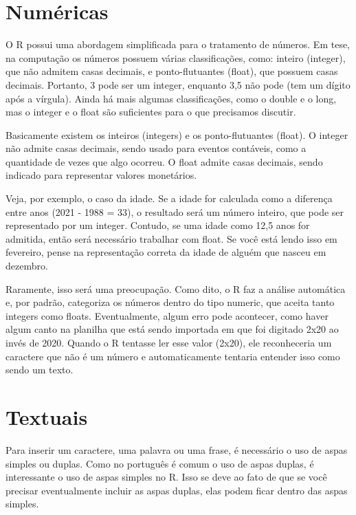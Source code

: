 \documentclass[
]{book}
\begin{document}
\hypertarget{numuxe9ricas}{%
\section{Numéricas}\label{numuxe9ricas}}

O R possui uma abordagem simplificada para o tratamento de números. Em tese, na computação os números possuem várias classificações, como: inteiro (integer), que não admitem casas decimais, e ponto-flutuantes (float), que possuem casas decimais. Portanto, 3 pode ser um integer, enquanto 3,5 não pode (tem um dígito após a vírgula). Ainda há mais algumas classificações, como o double e o long, mas o integer e o float são suficientes para o que precisamos discutir.

Basicamente existem os inteiros (integers) e os ponto-flutuantes (float). O integer não admite casas decimais, sendo usado para eventos contáveis, como a quantidade de vezes que algo ocorreu. O float admite casas decimais, sendo indicado para representar valores monetários.

Veja, por exemplo, o caso da idade. Se a idade for calculada como a diferença entre anos (2021 - 1988 = 33), o resultado será um número inteiro, que pode ser representado por um integer. Contudo, se uma idade como 12,5 anos for admitida, então será necessário trabalhar com float. Se você está lendo isso em fevereiro, pense na representação correta da idade de alguém que nasceu em dezembro.

Raramente, isso será uma preocupação. Como dito, o R faz a análise automática e, por padrão, categoriza os números dentro do tipo numeric, que aceita tanto integers como floats. Eventualmente, algum erro pode acontecer, como haver algum canto na planilha que está sendo importada em que foi digitado 2x20 ao invés de 2020. Quando o R tentasse ler esse valor (2x20), ele reconheceria um caractere que não é um número e automaticamente tentaria entender isso como sendo um texto.

\hypertarget{textuais}{%
\section{Textuais}\label{textuais}}

Para inserir um caractere, uma palavra ou uma frase, é necessário o uso de aspas simples ou duplas. Como no português é comum o uso de aspas duplas, é interessante o uso de aspas simples no R. Isso se deve ao fato de que se você precisar eventualmente incluir as aspas duplas, elas podem ficar dentro das aspas simples.
\end{document}
